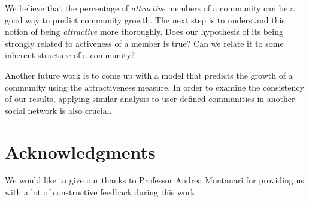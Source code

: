 \documentclass{sig-alternate}
\begin{document}
We believe that the percentage of \emph{attractive} members of a community can be a good way to
predict  community growth. The next step is to understand this notion of being \emph{attractive} more 
thoroughly. Does our hypothesis of its being strongly related to activeness of a member is true? 
Can we relate it to some inherent structure of a community? 

Another future work is to come up with a model that predicts the growth of a community using the attractiveness measure. In order to examine the consistency of our results, applying similar analysis to user-defined communities in another social network  is also crucial.

\section*{Acknowledgments}

We would like to give our thanks to Professor Andrea Montanari for providing us with a lot of  constructive feedback during this work.
\end{document}
